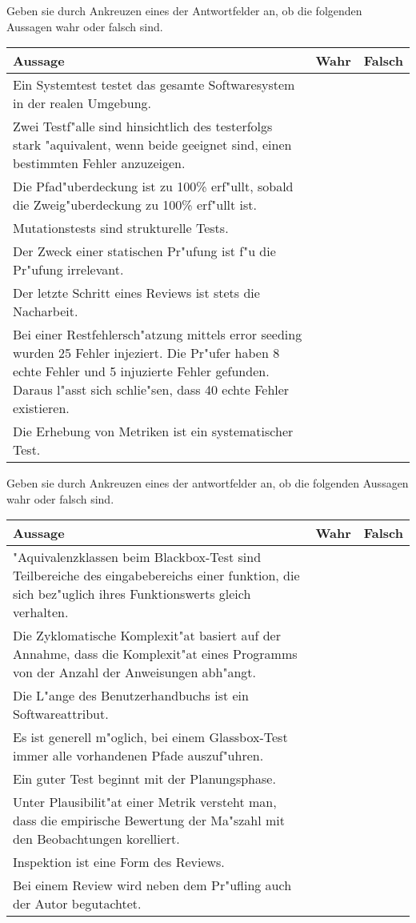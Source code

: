 \documentclass[12pt]{exam}
\begin{document}
\begin{questions}
\question[8] Geben sie durch Ankreuzen eines der Antwortfelder an, ob die folgenden Aussagen wahr oder falsch sind. \\
\addpoints
\begin{tabular}{| p{12cm} | c | c |} \hline
    Aussage & Wahr & Falsch \\ \hline
    Ein Systemtest testet das gesamte Softwaresystem in der realen Umgebung. & & \\ \hline
    Zwei Testf"alle sind hinsichtlich des testerfolgs stark "aquivalent, wenn beide geeignet sind, einen bestimmten Fehler anzuzeigen. & & \\ \hline
    Die Pfad"uberdeckung ist zu 100\% erf"ullt, sobald die Zweig"uberdeckung zu 100\% erf"ullt ist. & & \\ \hline
    Mutationstests sind strukturelle Tests. & & \\ \hline
    Der Zweck einer statischen Pr"ufung ist f"u die Pr"ufung irrelevant. & & \\ \hline
    Der letzte Schritt eines Reviews ist stets die Nacharbeit. & & \\ \hline
    Bei einer Restfehlersch"atzung mittels error seeding wurden 25 Fehler injeziert. Die Pr"ufer haben 8 echte Fehler und 5 injuzierte Fehler gefunden. Daraus l"asst sich schlie"sen, dass 40 echte Fehler existieren. & & \\ \hline
    Die Erhebung von Metriken ist ein systematischer Test. & & \\ \hline
\end{tabular}

\question[8] Geben sie durch Ankreuzen eines der antwortfelder an, ob die folgenden Aussagen wahr oder falsch sind. \\
\addpoints
\begin{tabular}{| p{12cm} | c | c |} \hline
    Aussage & Wahr & Falsch \\ \hline
    "Aquivalenzklassen beim Blackbox-Test sind Teilbereiche des eingabebereichs einer funktion, die sich bez"uglich ihres Funktionswerts gleich verhalten. & & \\ \hline
    Die Zyklomatische Komplexit"at basiert auf der Annahme, dass die Komplexit"at eines Programms von der Anzahl der Anweisungen abh"angt. & & \\ \hline
    Die L"ange des Benutzerhandbuchs ist ein Softwareattribut. & & \\ \hline
    Es ist generell m"oglich, bei einem Glassbox-Test immer alle vorhandenen Pfade auszuf"uhren. & & \\ \hline
    Ein guter Test beginnt mit der Planungsphase. & & \\ \hline
    Unter Plausibilit"at einer Metrik versteht man, dass die empirische Bewertung der Ma"szahl mit den Beobachtungen korelliert. & & \\ \hline
    Inspektion ist eine Form des Reviews. & & \\ \hline
    Bei einem Review wird neben dem Pr"ufling auch der Autor begutachtet. & & \\ \hline
\end{tabular}


\end{questions}
\end{document}
